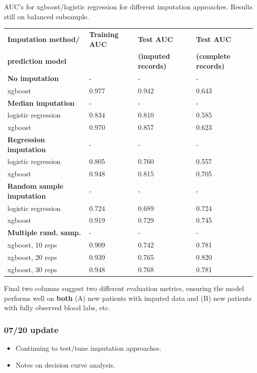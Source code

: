 \documentclass[12pt]{article}
\begin{document}
AUC's for xgboost/logistic regression for different imputation approaches. Results still on balanced subsample.
\begin{center}
\begin{tabular}{|l|l|l|l|}
\hline
\textbf{Imputation method/} & \textbf{Training AUC} & \textbf{Test AUC} & \textbf{Test AUC} \\
\textbf{prediction model}& & \textbf{(imputed records)} & \textbf{(complete records)} \\ \hline
{\bf No imputation} & - & - & - \\ \hline
xgboost & 0.977 & 0.942 & 0.643 \\ \hline
{\bf Median imputation} & - & - & - \\ \hline
logistic regression & 0.834 & 0.810 & 0.585 \\ \hline
xgboost & 0.970 & 0.857 & 0.623 \\ \hline
{\bf Regression imputation} & - & - & - \\ \hline
logistic regression & 0.805 & 0.760 & 0.557 \\ \hline
xgboost & 0.948 & 0.815 & 0.705 \\ \hline
{\bf Random sample imputation} & - & - & - \\ \hline
logistic regression & 0.724 & 0.689 & 0.724 \\ \hline
xgboost & 0.919 & 0.729 & 0.745 \\ \hline
{\bf Multiple rand. samp.} & - & - & - \\ \hline
xgboost, 10 reps & 0.909 & 0.742 & 0.781 \\ \hline
xgboost, 20 reps & 0.939 & 0.765 & 0.820 \\ \hline
xgboost, 30 reps & 0.948 & 0.768 & 0.781 \\ \hline
\end{tabular}
\end{center}

Final two columns suggest two different evaluation metrics, ensuring the model performs well on \textbf{both} (A) new patients with imputed data and (B) new patients with fully observed blood labs, etc.

\pagebreak

\subsubsection*{07/20 update}

\begin{itemize}
  \item Continuing to test/tune imputation approaches.
  \item Notes on decision curve analysis.
\end{itemize}
\end{document}
